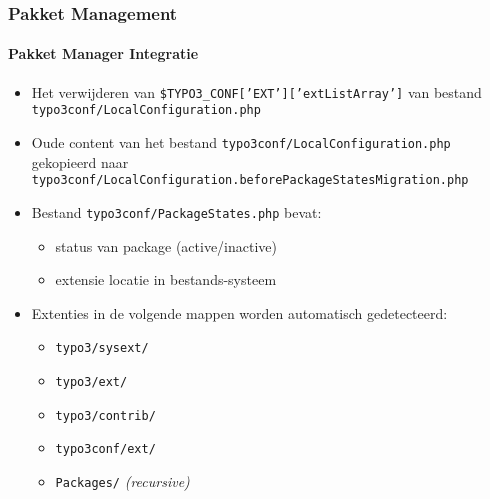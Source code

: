 
\begin{frame}[fragile]
	\frametitle{Pakket Management}
	\framesubtitle{Pakket Manager Integratie}

	\begin{itemize}
		\item Het verwijderen van \texttt{\$TYPO3\_CONF['EXT']['extListArray']} van bestand\newline
			\smaller\texttt{typo3conf/LocalConfiguration.php}\normalsize

		\item Oude content van het bestand \small\texttt{typo3conf/LocalConfiguration.php} gekopieerd naar\normalsize\newline
			\smaller\texttt{typo3conf/LocalConfiguration.beforePackageStatesMigration.php}\normalsize

		\item Bestand \texttt{typo3conf/PackageStates.php} bevat:

			\begin{itemize}
				\item status van package (active/inactive)
				\item extensie locatie in bestands-systeem
			\end{itemize}

		\item Extenties in de volgende mappen worden automatisch gedetecteerd:

			\begin{itemize}
				\item \texttt{typo3/sysext/}
				\item \texttt{typo3/ext/}
				\item \texttt{typo3/contrib/}
				\item \texttt{typo3conf/ext/}
				\item \texttt{Packages/} \emph{(recursive)}
			\end{itemize}

	\end{itemize}

\end{frame}



